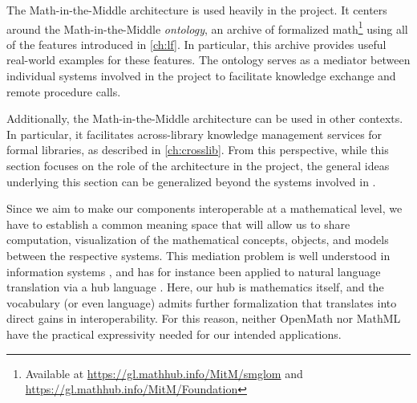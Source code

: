

The Math-in-the-Middle architecture is used heavily in the \ODK project. It centers around the Math-in-the-Middle \emph{ontology}, an \mmt archive of formalized math\footnote{Available at \url{https://gl.mathhub.info/MitM/smglom} and \url{https://gl.mathhub.info/MitM/Foundation}} using all of the features introduced in \autoref{ch:lf}. In particular, this archive provides useful real-world examples for these features. The ontology serves as a mediator between individual systems involved in the \ODK project to facilitate knowledge exchange and remote procedure calls.

Additionally, the Math-in-the-Middle architecture can be used in other contexts. In particular, it facilitates across-library knowledge management services for formal libraries, as described in \autoref{ch:crosslib}. From this perspective, while this section focuses on the role of the architecture in the \ODK project, the general ideas underlying this section can be generalized beyond the systems involved in \ODK.

Since we aim to make our components interoperable at a mathematical level, we have to establish a common meaning space that will 
allow us to share computation, visualization of the mathematical concepts, objects, and models
between the respective systems. This mediation problem is well understood in information systems
\cite{mediator}, and has for instance been applied to natural language translation via a hub
language \cite{kanayama}.
Here, our hub is mathematics itself, and the vocabulary (or even language) admits further
formalization that translates into direct gains in interoperability. For this reason, neither
OpenMath \cite{openmath} nor MathML \cite{mathml} have the practical expressivity needed for
our intended applications. 



